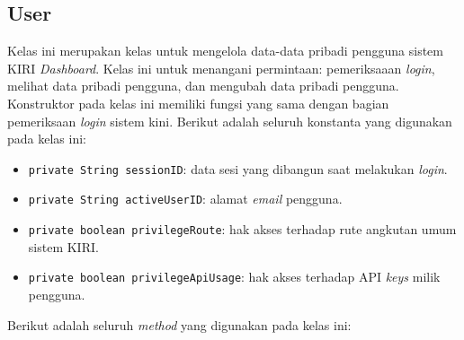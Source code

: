 \subsection{User}
\label{sec:user}
Kelas ini merupakan kelas untuk mengelola data-data pribadi pengguna sistem KIRI \textit{Dashboard}. Kelas ini untuk menangani permintaan: pemeriksaaan \textit{login}, melihat data pribadi pengguna, dan mengubah data pribadi pengguna. Konstruktor pada kelas ini memiliki fungsi yang sama dengan bagian pemeriksaan \textit{login} sistem kini. Berikut adalah seluruh konstanta yang digunakan pada kelas ini:
\begin{itemize}
	\item \texttt{private String sessionID}: data sesi yang dibangun saat melakukan \textit{login}.
	\item \texttt{private String activeUserID}: alamat \textit{email} pengguna.
	\item \texttt{private boolean privilegeRoute}: hak akses terhadap rute angkutan umum sistem KIRI.
	\item \texttt{private boolean privilegeApiUsage}: hak akses terhadap API \textit{keys} milik pengguna.
\end{itemize}
Berikut adalah seluruh \textit{method} yang digunakan pada kelas ini:
